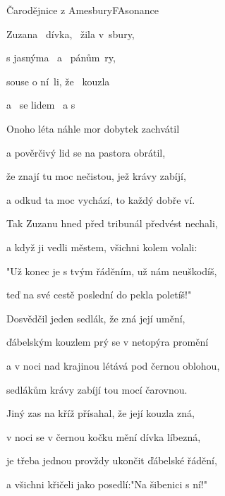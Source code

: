 \setcounter{page}{12}
\begin{song}{Čarodějnice z Amesbury}{F}{Asonance}
  \begin{SBVerse}
    Zuzana  dívka,  žila v sbury,

s jasnýma  a  pánům ry,

souse o ní li, že  kouzla 

a  se lidem  a s   

  \end{SBVerse}

  \begin{SBVerse}
Onoho léta náhle mor dobytek zachvátil

a pověrčivý lid se na pastora obrátil,

že znají tu moc nečistou, jež krávy zabíjí,

a odkud ta moc vychází, to každý dobře ví.

  \end{SBVerse}

  \begin{SBVerse}
Tak Zuzanu hned před tribunál předvést nechali,

a když ji vedli městem, všichni kolem volali:

"Už konec je s tvým řáděním, už nám neuškodíš,

teď na své cestě poslední do pekla poletíš!"

  \end{SBVerse}

  \begin{SBVerse}
Dosvědčil jeden sedlák, že zná její umění,

ďábelským kouzlem prý se v netopýra promění

a v noci nad krajinou létává pod černou oblohou,

sedlákům krávy zabíjí tou mocí čarovnou.

  \end{SBVerse}

  \begin{SBVerse}
Jiný zas na kříž přísahal, že její kouzla zná,

v noci se v černou kočku mění dívka líbezná,

je třeba jednou provždy ukončit ďábelské řádění,

a všichni křičeli jako posedlí:"Na šibenici s ní!"


\end{SBVerse}
\end{song}
